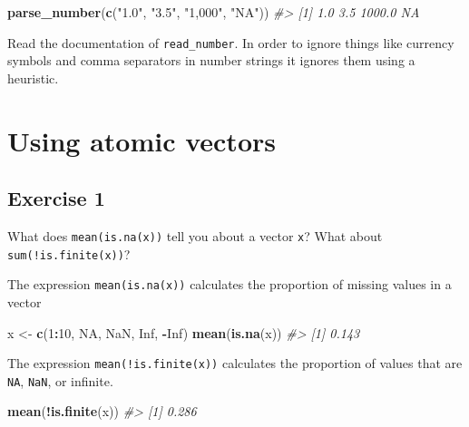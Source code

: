 \documentclass[]{book}
\newenvironment{Shaded}{\begin{snugshade}}{\end{snugshade}}
\newcommand{\CommentTok}[1]{\textcolor[rgb]{0.56,0.35,0.01}{\textit{#1}}}
\newcommand{\DecValTok}[1]{\textcolor[rgb]{0.00,0.00,0.81}{#1}}
\newcommand{\KeywordTok}[1]{\textcolor[rgb]{0.13,0.29,0.53}{\textbf{#1}}}
\newcommand{\NormalTok}[1]{#1}
\newcommand{\OperatorTok}[1]{\textcolor[rgb]{0.81,0.36,0.00}{\textbf{#1}}}
\newcommand{\OtherTok}[1]{\textcolor[rgb]{0.56,0.35,0.01}{#1}}
\newcommand{\StringTok}[1]{\textcolor[rgb]{0.31,0.60,0.02}{#1}}
\theoremstyle{definition}
\theoremstyle{definition}
\theoremstyle{definition}
\theoremstyle{remark}
\begin{document}
\begin{Shaded}
\begin{Highlighting}[]
\KeywordTok{parse_number}\NormalTok{(}\KeywordTok{c}\NormalTok{(}\StringTok{"1.0"}\NormalTok{, }\StringTok{"3.5"}\NormalTok{, }\StringTok{"1,000"}\NormalTok{, }\StringTok{"NA"}\NormalTok{))}
\CommentTok{#> [1]    1.0    3.5 1000.0     NA}
\end{Highlighting}
\end{Shaded}

Read the documentation of \texttt{read\_number}. In order to ignore
things like currency symbols and comma separators in number strings it
ignores them using a heuristic.

\hypertarget{using-atomic-vectors}{%
\section{Using atomic vectors}\label{using-atomic-vectors}}

\hypertarget{exercise-1-49}{%
\subsection{Exercise 1}\label{exercise-1-49}}

What does \texttt{mean(is.na(x))} tell you about a vector \texttt{x}?
What about \texttt{sum(!is.finite(x))}?

The expression \texttt{mean(is.na(x))} calculates the proportion of
missing values in a vector

\begin{Shaded}
\begin{Highlighting}[]
\NormalTok{x <-}\StringTok{ }\KeywordTok{c}\NormalTok{(}\DecValTok{1}\OperatorTok{:}\DecValTok{10}\NormalTok{, }\OtherTok{NA}\NormalTok{, }\OtherTok{NaN}\NormalTok{, }\OtherTok{Inf}\NormalTok{, }\OperatorTok{-}\OtherTok{Inf}\NormalTok{)}
\KeywordTok{mean}\NormalTok{(}\KeywordTok{is.na}\NormalTok{(x))}
\CommentTok{#> [1] 0.143}
\end{Highlighting}
\end{Shaded}

The expression \texttt{mean(!is.finite(x))} calculates the proportion of
values that are \texttt{NA}, \texttt{NaN}, or infinite.

\begin{Shaded}
\begin{Highlighting}[]
\KeywordTok{mean}\NormalTok{(}\OperatorTok{!}\KeywordTok{is.finite}\NormalTok{(x))}
\CommentTok{#> [1] 0.286}
\end{Highlighting}
\end{Shaded}
\end{document}
